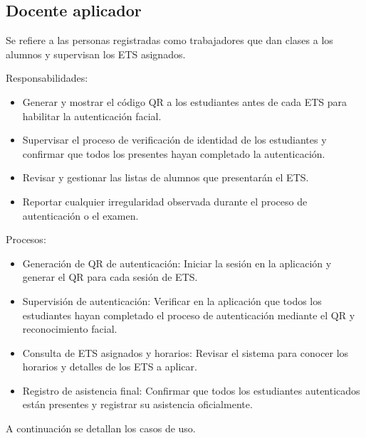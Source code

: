 \begin{Usuario}{\hypertarget{tDocenteAplicador}{\subsection{Docente aplicador}}}{
		Se refiere a las personas registradas como trabajadores que dan clases a los alumnos y supervisan los ETS asignados.
	}
	\item[Responsabilidades:] \cdtEmpty
	\begin{itemize}
		\item Generar y mostrar el código QR a los estudiantes antes de cada ETS para habilitar la autenticación facial.
		\item Supervisar el proceso de verificación de identidad de los estudiantes y confirmar que todos los presentes hayan completado la autenticación.
		\item Revisar y gestionar las listas de alumnos que presentarán el ETS.
		\item Reportar cualquier irregularidad observada durante el proceso de autenticación o el examen.
	\end{itemize}
	
	\item[Procesos:] \cdtEmpty
	\begin{itemize}
		\item Generación de QR de autenticación: Iniciar la sesión en la aplicación y generar el QR para cada sesión de ETS.
		\item Supervisión de autenticación: Verificar en la aplicación que todos los estudiantes hayan completado el proceso de autenticación mediante el QR y reconocimiento facial.
		\item Consulta de ETS asignados y horarios: Revisar el sistema para conocer los horarios y detalles de los ETS a aplicar.
		\item Registro de asistencia final: Confirmar que todos los estudiantes autenticados están presentes y registrar su asistencia oficialmente.
	\end{itemize}
\end{Usuario}



A continuación se detallan los casos de uso.






